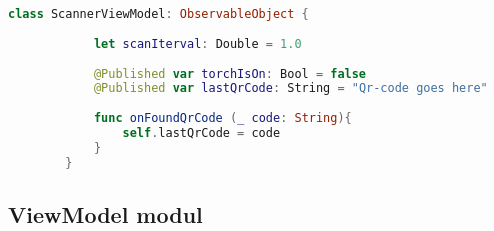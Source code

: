 \begin{spacing}{2}
\end{spacing}
\begin{minipage}{\textwidth}
    \linespread{0.8}\selectfont
    \begin{lstlisting}[language=swift]
        class ScannerViewModel: ObservableObject {
        
            let scanIterval: Double = 1.0
            
            @Published var torchIsOn: Bool = false
            @Published var lastQrCode: String = "Qr-code goes here"
            
            func onFoundQrCode (_ code: String){
                self.lastQrCode = code
            }
        }
\end{lstlisting}   
\end{minipage}

\subsection*{ViewModel modul}

